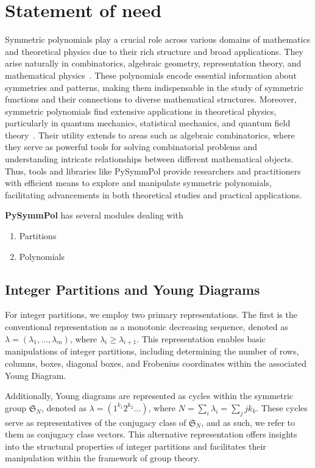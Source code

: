 \documentclass[a4paper,10pt]{amsart}
\begin{document}
\section{Statement of need}

Symmetric polynomials play a crucial role across various domains of
mathematics and theoretical physics due to their rich structure and
broad applications. They arise naturally in combinatorics, algebraic
geometry, representation theory, and mathematical
physics~\cite{Macdonald:1998, Fulton:2004}. These polynomials encode
essential information about symmetries and patterns, making them
indispensable in the study of symmetric functions and their
connections to diverse mathematical structures. Moreover, symmetric
polynomials find extensive applications in theoretical physics,
particularly in quantum mechanics, statistical mechanics, and quantum
field theory~\cite{Babelon:2003, Korepin:1993, Marino:2005,
  Wheeler:2010}.  Their utility extends to areas such as algebraic
combinatorics, where they serve as powerful tools for solving
combinatorial problems and understanding intricate relationships
between different mathematical objects. Thus, tools and libraries like
PySymmPol provide researchers and practitioners with efficient means
to explore and manipulate symmetric polynomials, facilitating
advancements in both theoretical studies and practical applications.
 
\textbf{PySymmPol} has several modules dealing with
\begin{enumerate}
\item Partitions
\item Polynomials
\end{enumerate}

\subsection{Integer Partitions and Young Diagrams}

For integer partitions, we employ two primary representations. The
first is the conventional representation as a monotonic decreasing
sequence, denoted as $\lambda = (\lambda_1, \dots, \lambda_m)$, where
$\lambda_i \geq \lambda_{i+1}$. This representation enables basic
manipulations of integer partitions, including determining the number
of rows, columns, boxes, diagonal boxes, and Frobenius coordinates
within the associated Young Diagram.

Additionally, Young diagrams are represented as cycles within the
symmetric group $\mathfrak{S}_N$, denoted as $\lambda = (1^{k_1}
2^{k_2} \dots)$, where $N = \sum_i\lambda_i = \sum_j j k_k$. These
cycles serve as representatives of the conjugacy class of
$\mathfrak{S}_N$, and as such, we refer to them as conjugacy class
vectors. This alternative representation offers insights into the
structural properties of integer partitions and facilitates their
manipulation within the framework of group theory.
\end{document}
